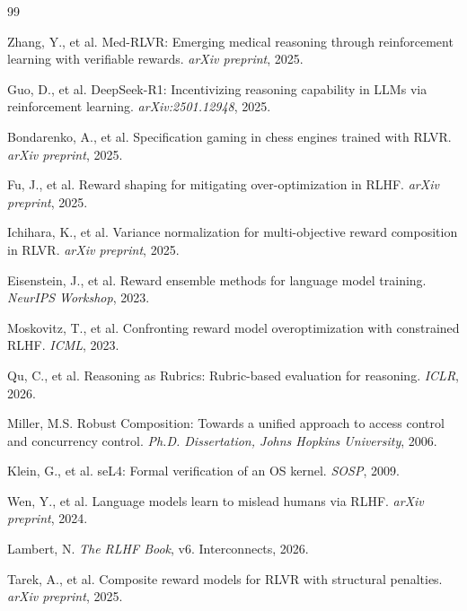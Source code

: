 \documentclass[11pt,a4paper]{article}
\begin{document}
\begin{thebibliography}{99}

Zhang, Y., et al.
\newblock Med-RLVR: Emerging medical reasoning through reinforcement learning with verifiable rewards.
\newblock \textit{arXiv preprint}, 2025.

Guo, D., et al.
\newblock DeepSeek-R1: Incentivizing reasoning capability in LLMs via reinforcement learning.
\newblock \textit{arXiv:2501.12948}, 2025.

Bondarenko, A., et al.
\newblock Specification gaming in chess engines trained with RLVR.
\newblock \textit{arXiv preprint}, 2025.

Fu, J., et al.
\newblock Reward shaping for mitigating over-optimization in RLHF.
\newblock \textit{arXiv preprint}, 2025.

Ichihara, K., et al.
\newblock Variance normalization for multi-objective reward composition in RLVR.
\newblock \textit{arXiv preprint}, 2025.

Eisenstein, J., et al.
\newblock Reward ensemble methods for language model training.
\newblock \textit{NeurIPS Workshop}, 2023.

Moskovitz, T., et al.
\newblock Confronting reward model overoptimization with constrained RLHF.
\newblock \textit{ICML}, 2023.

Qu, C., et al.
\newblock Reasoning as Rubrics: Rubric-based evaluation for reasoning.
\newblock \textit{ICLR}, 2026.

Miller, M.S.
\newblock Robust Composition: Towards a unified approach to access control and concurrency control.
\newblock \textit{Ph.D. Dissertation, Johns Hopkins University}, 2006.

Klein, G., et al.
\newblock seL4: Formal verification of an OS kernel.
\newblock \textit{SOSP}, 2009.

Wen, Y., et al.
\newblock Language models learn to mislead humans via RLHF.
\newblock \textit{arXiv preprint}, 2024.

Lambert, N.
\newblock \textit{The RLHF Book}, v6.
\newblock Interconnects, 2026.

Tarek, A., et al.
\newblock Composite reward models for RLVR with structural penalties.
\newblock \textit{arXiv preprint}, 2025.

\end{thebibliography}
\end{document}
